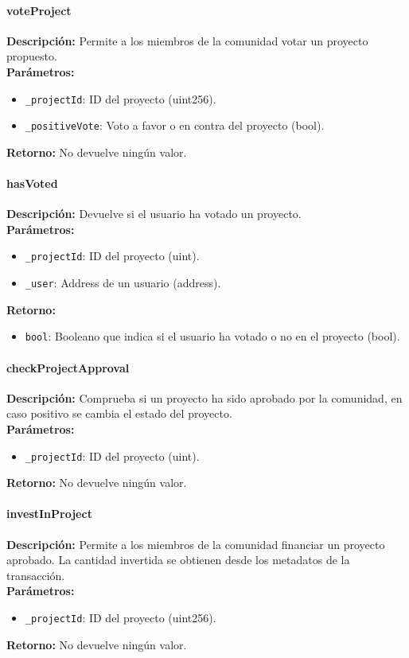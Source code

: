 \paragraph{voteProject}
\noindent
\textbf{Descripción:}
Permite a los miembros de la comunidad votar un proyecto propuesto. \\
\textbf{Parámetros:}
\begin{itemize}
    \item \texttt{\_projectId}: ID del proyecto (uint256).
    \item \texttt{\_positiveVote}: Voto a favor o en contra del proyecto (bool).
\end{itemize}
\textbf{Retorno:}
No devuelve ningún valor.


\paragraph{hasVoted}
\noindent
\textbf{Descripción:}
Devuelve si el usuario ha votado un proyecto. \\
\textbf{Parámetros:}
\begin{itemize}
    \item \texttt{\_projectId}: ID del proyecto (uint).
    \item \texttt{\_user}: Address de un usuario (address).
\end{itemize}
\textbf{Retorno:}
\begin{itemize}
    \item \texttt{bool}: Booleano que indica si el usuario ha votado o no en el proyecto (bool).
\end{itemize}


\paragraph{checkProjectApproval}
\noindent
\textbf{Descripción:}
Comprueba si un proyecto ha sido aprobado por la comunidad, en caso positivo se cambia el estado del proyecto. \\
\textbf{Parámetros:}
\begin{itemize}
    \item \texttt{\_projectId}: ID del proyecto (uint).
\end{itemize}
\textbf{Retorno:}
No devuelve ningún valor.


\paragraph{investInProject}
\noindent
\textbf{Descripción:}
Permite a los miembros de la comunidad financiar un proyecto aprobado. La cantidad invertida se obtienen desde los metadatos de la transacción. \\
\textbf{Parámetros:}
\begin{itemize}
\item \texttt{\_projectId}: ID del proyecto (uint256).
\end{itemize}
\textbf{Retorno:}
No devuelve ningún valor.


